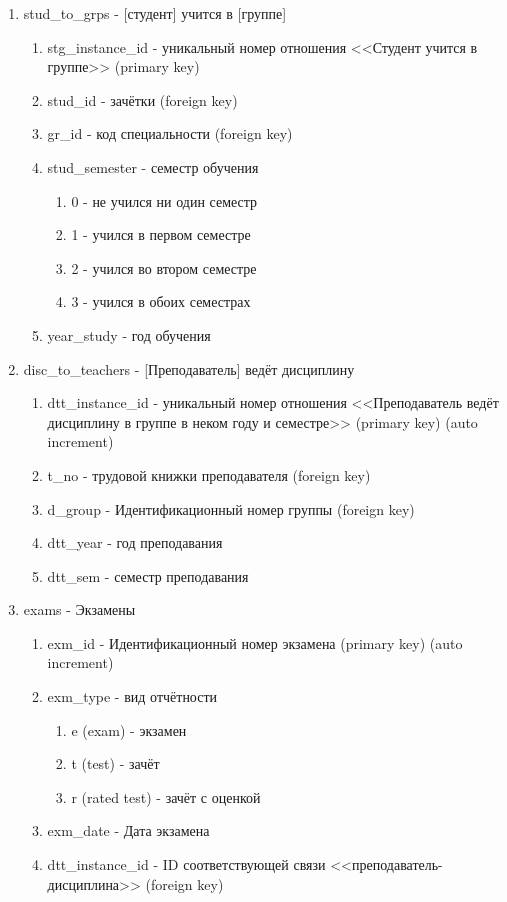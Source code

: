 \documentclass[zuevDbReport.tex]{subfiles}
\begin{document}
\begin{enumerate}
\item{}stud\_to\_grps - [студент] учится в [группе]
	\begin{enumerate}
	\item{}stg\_instance\_id - уникальный номер отношения <<Студент учится в группе>> (primary key)
	\item{}stud\_id - \textnumero зачётки (foreign key)
	\item{}gr\_id - код специальности (foreign key)
	\item{}stud\_semester - семестр обучения
		\begin{enumerate}
		\item{}0 - не учился ни один семестр
		\item{}1 - учился в первом семестре
		\item{}2 - учился во втором семестре
		\item{}3 - учился в обоих семестрах
		\end{enumerate}
	\item{}year\_study - год обучения
	\end{enumerate}

\item{}disc\_to\_teachers - [Преподаватель] ведёт дисциплину
	\begin{enumerate}
	\item{}dtt\_instance\_id - уникальный номер отношения <<Преподаватель ведёт дисциплину в группе в неком году и семестре>> (primary key) (auto increment)
	\item{}t\_no - \textnumero трудовой книжки преподавателя (foreign key)
	\item{}d\_group - Идентификационный номер группы (foreign key)
	\item{}dtt\_year - год преподавания
	\item{}dtt\_sem - семестр преподавания
	\end{enumerate}

\item{}exams - Экзамены
	\begin{enumerate}
	\item{}exm\_id - Идентификационный номер экзамена (primary key) (auto increment)
	\item{}exm\_type - вид отчётности
		\begin{enumerate}
		\item{}e (exam) - экзамен
		\item{}t (test) - зачёт
		\item{}r (rated test) - зачёт с оценкой
		\end{enumerate}
	\item{}exm\_date - Дата экзамена
	\item{}dtt\_instance\_id - ID соответствующей связи <<преподаватель-дисциплина>> (foreign key)
	\end{enumerate}


\end{enumerate}
\end{document}
